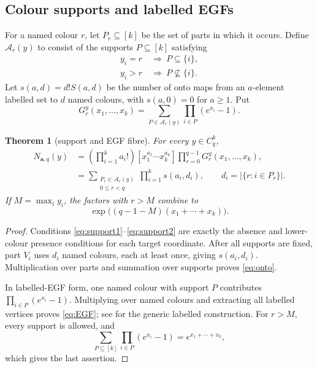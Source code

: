\documentclass[11pt,a4paper]{amsart}
\newtheorem{theorem}{Theorem}[section]
\theoremstyle{definition}
\theoremstyle{remark}
\newcommand{\Cq}{C_q}
\begin{document}
\subsection{Colour supports and labelled EGFs}

For a named colour \(r\), let \(P_r\subseteq[k]\) be the set of parts in
which it occurs.  Define \(\mathcal A_r(y)\) to consist of the supports
\(P\subseteq[k]\) satisfying
\begin{align}
 y_i=r&\ \Longrightarrow\ P\subseteq\{i\},               \label{eq:support1}\\
 y_i>r&\ \Longrightarrow\ P\nsubseteq\{i\}.              \label{eq:support2}
\end{align}
Let \(s(a,d)=d!S(a,d)\) be the number of onto maps from an \(a\)-element
labelled set to \(d\) named colours, with \(s(a,0)=0\) for \(a\ge1\).
Put
\[
 G_r^y(x_1,\ldots,x_k)=
 \sum_{P\in\mathcal A_r(y)}
 \prod_{i\in P}(e^{x_i}-1).
\]

\begin{theorem}[support and EGF fibre]\label{thm:support}
For every \(y\in\Cq^k\),
\begin{align}
 N_{\mathbf a,q}(y)
 &=\left(\prod_{i=1}^k a_i!\right)
 [x_1^{a_1}\cdots x_k^{a_k}]
 \prod_{r=0}^{q-1}G_r^y(x_1,\ldots,x_k),                 \label{eq:EGF}\\
 &=\sum_{\substack{P_r\in\mathcal A_r(y)\\0\le r<q}}
 \prod_{i=1}^k s(a_i,d_i),\qquad
 d_i=|\{r:i\in P_r\}|.                                  \label{eq:onto}
\end{align}
If \(M=\max_i y_i\), the factors with \(r>M\) combine to
\[
 \exp\!\bigl((q-1-M)(x_1+\cdots+x_k)\bigr).
\]
\end{theorem}

\begin{proof}
Conditions \eqref{eq:support1}--\eqref{eq:support2} are exactly the absence
and lower-colour presence conditions for each target coordinate.  After all
supports are fixed, part \(V_i\) uses \(d_i\) named colours, each at least
once, giving \(s(a_i,d_i)\).  Multiplication over parts and summation over
supports proves \eqref{eq:onto}.

In labelled-EGF form, one named colour with support \(P\) contributes
\(\prod_{i\in P}(e^{x_i}-1)\).  Multiplying over named colours and extracting
all labelled vertices proves \eqref{eq:EGF}; see
\cite{FlajoletSedgewick2009} for the generic labelled construction.  For
\(r>M\), every support is allowed, and
\[
 \sum_{P\subseteq[k]}\prod_{i\in P}(e^{x_i}-1)
 =e^{x_1+\cdots+x_k},
\]
which gives the last assertion.
\end{proof}
\end{document}

